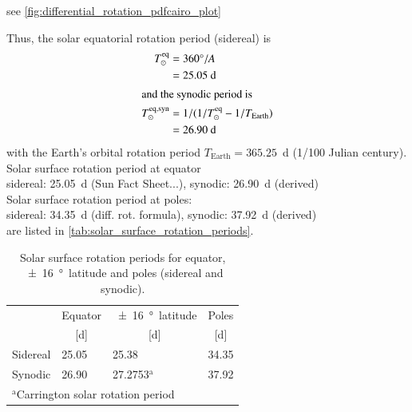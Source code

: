 see \autoref{fig:differential_rotation_pdfcairo_plot}
\begin{figure}[htb]
\end{figure}

\noindent Thus, the solar equatorial rotation period (sidereal) is
\begin{align}
	T_\odot^\text{eq} &= 360\degree / A\\
	&= 25.05~\text{d}	\nonumber\\
\shortintertext{and the synodic period is}
	T_\odot^\text{eq,syn} &= 1/(1/T_\odot^\text{eq} - 1/T_\text{Earth})\\
	&= 26.90~\text{d}	\nonumber
\end{align}
with the Earth's orbital rotation period $T_\text{Earth} = 365.25$~d (1/100 Julian century).\\

Solar surface rotation period at equator\\
sidereal: 25.05~d (Sun Fact Sheet...), synodic: 26.90~d (derived)\\
Solar surface rotation period at poles:\\
sidereal: 34.35~d (diff. rot. formula), synodic: 37.92~d (derived)\\
are listed in \autoref{tab:solar_surface_rotation_periods}.\\
\begin{table}[htb]\small
	\centering
	\captionsetup{belowskip=4pt}
	\caption{Solar surface rotation periods for equator, \SI{+-16}{\degree}~latitude and poles (sidereal and synodic).}
	\begin{tabular}{llll}
		\toprule
				&Equator	&\SI{+-16}{\degree}~latitude	&Poles\\
				&\multicolumn{1}{c}{[d]}	&\multicolumn{1}{c}{[d]}	&\multicolumn{1}{c}{[d]}\\
		\midrule
		Sidereal	&25.05	&25.38	&34.35\\
		Synodic	&26.90	&27.2753$^\text{a}$	&37.92\\
		\bottomrule
		\multicolumn{4}{l}{\footnotesize{$^\text{a}$Carrington solar rotation period}}
	\end{tabular}
	\label{tab:solar_surface_rotation_periods}
\end{table}


